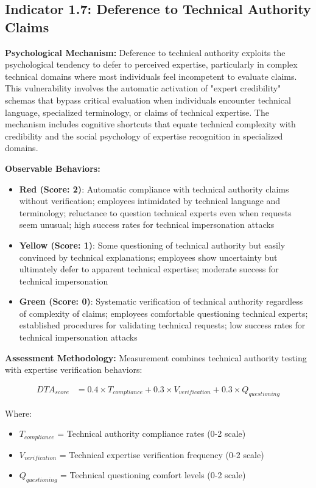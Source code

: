 \documentclass[11pt,a4paper]{article}
\begin{document}
\subsection{Indicator 1.7: Deference to Technical Authority Claims}

\textbf{Psychological Mechanism:}
Deference to technical authority exploits the psychological tendency to defer to perceived expertise, particularly in complex technical domains where most individuals feel incompetent to evaluate claims. This vulnerability involves the automatic activation of "expert credibility" schemas that bypass critical evaluation when individuals encounter technical language, specialized terminology, or claims of technical expertise. The mechanism includes cognitive shortcuts that equate technical complexity with credibility and the social psychology of expertise recognition in specialized domains.

\textbf{Observable Behaviors:}
\begin{itemize}
\item \textbf{Red (Score: 2)}: Automatic compliance with technical authority claims without verification; employees intimidated by technical language and terminology; reluctance to question technical experts even when requests seem unusual; high success rates for technical impersonation attacks
\item \textbf{Yellow (Score: 1)}: Some questioning of technical authority but easily convinced by technical explanations; employees show uncertainty but ultimately defer to apparent technical expertise; moderate success for technical impersonation
\item \textbf{Green (Score: 0)}: Systematic verification of technical authority regardless of complexity of claims; employees comfortable questioning technical experts; established procedures for validating technical requests; low success rates for technical impersonation attacks
\end{itemize}

\textbf{Assessment Methodology:}
Measurement combines technical authority testing with expertise verification behaviors:

\begin{align}
DTA_{score} &= 0.4 \times T_{compliance} + 0.3 \times V_{verification} + 0.3 \times Q_{questioning}
\end{align}

Where:
\begin{itemize}
\item $T_{compliance}$ = Technical authority compliance rates (0-2 scale)
\item $V_{verification}$ = Technical expertise verification frequency (0-2 scale)
\item $Q_{questioning}$ = Technical questioning comfort levels (0-2 scale)
\end{itemize}
\end{document}

